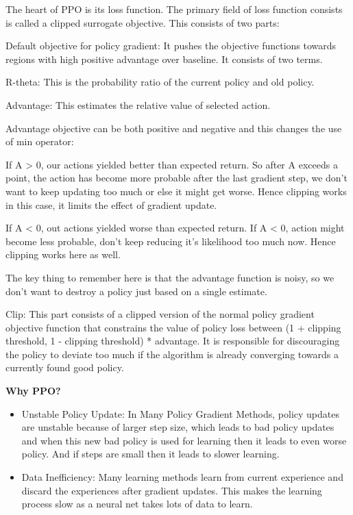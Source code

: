 \documentclass[conference]{IEEEtran}
\begin{document}
The heart of PPO is its loss function. The primary field of loss function consists is called a clipped surrogate objective. This consists of two parts:

Default objective for policy gradient: It pushes the objective functions towards regions with high positive advantage over baseline. It consists of two terms.

R-theta: This is the probability ratio of the current policy and old policy. 

Advantage: This estimates the relative value of selected action. 

Advantage objective can be both positive and negative and this changes the use of min operator:
	
If A > 0, our actions yielded better than expected return. So after A exceeds a point, the action has become more probable after the last gradient step, we don’t want to keep updating too much or else it might get worse. Hence clipping works in this case, it limits the effect of gradient update.

If A < 0, out actions yielded worse than expected return. If A < 0, action might become less probable, don’t keep reducing it’s likelihood too much now. Hence clipping works here as well.

The key thing to remember here is that the advantage function is noisy, so we don’t want to destroy a policy just based on a single estimate.

Clip: This part consists of a clipped version of the normal policy gradient objective function that constrains the value of policy loss between (1 + clipping threshold, 1 - clipping threshold) * advantage. It is responsible for discouraging the policy to deviate too much if the algorithm is already converging towards a currently found good policy.

\textbf{Why PPO?}\\

\begin{itemize}
\item Unstable Policy Update: In Many Policy Gradient Methods, policy updates are unstable because of larger step size, which leads to bad policy updates and when this new bad policy is used for learning then it leads to even worse policy. And if steps are small then it leads to slower learning. \\
\item Data Inefficiency: Many learning methods learn from current experience and discard the experiences after gradient updates. This makes the learning process slow as a neural net takes lots of data to learn.\\
\end{itemize}
\end{document}
